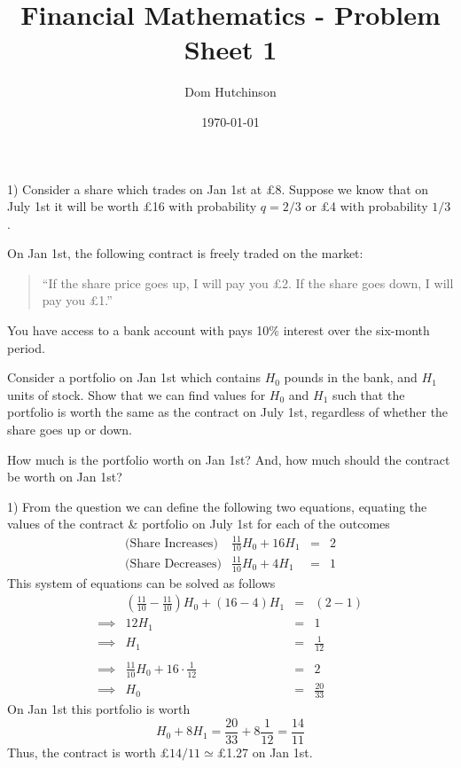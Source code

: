 \documentclass[11pt,a4paper]{article}
\begin{document}

\title{Financial Mathematics - Problem Sheet 1}
\author{Dom Hutchinson}
\date{\today}
\maketitle


\begin{question}{1)}
  Consider a share which trades on Jan 1st at £8. Suppose we know that on July 1st it will be worth £16 with probability $q=2/3$ or £4 with probability $1/3$.
  \par On Jan 1st, the following contract is freely traded on the market:
  \begin{quote}
    ``If the share price goes up, I will pay you £2. If the share goes down, I will pay you £1.''
  \end{quote}
  You have access to a bank account with pays 10\% interest over the six-month period.
  \par Consider a portfolio on Jan 1st which contains $H_0$ pounds in the bank, and $H_1$ units of stock. Show that we can find values for $H_0$ and $H_1$ such that the portfolio is worth the same as the contract on July 1st, regardless of whether the share goes up or down.
  \par How much is the portfolio worth on Jan 1st? And, how much should the contract be worth on Jan 1st?
\end{question}

\begin{answer}{1)}
  From the question we can define the following two equations, equating the values of the contract \& portfolio on July 1st for each of the outcomes
  \[\begin{array}{rrcl}
    \text{(Share Increases)}&\frac{11}{10}H_0+16H_1&=&2\\
    \text{(Share Decreases)}&\frac{11}{10}H_0+4H_1&=&1
  \end{array}\]
  This system of equations can be solved as follows
  \[\begin{array}{rrcl}
    &\left(\frac{11}{10}-\frac{11}{10}\right)H_0+(16-4)H_1&=&(2-1)\\
    \implies&12H_1&=&1\\
    \implies&H_1&=&\frac1{12}\\\\
    \implies&\frac{11}{10}H_0+16\cdot\frac1{12}&=&2\\
    \implies&H_0&=&\frac{20}{33}
  \end{array}\]
  On Jan 1st this portfolio is worth
  \[ H_0+8H_1=\frac{20}{33}+8\frac1{12}=\frac{14}{11} \]
  Thus, the contract is worth £$14/11\simeq$£1.27 on Jan 1st.
\end{answer}
\end{document}
